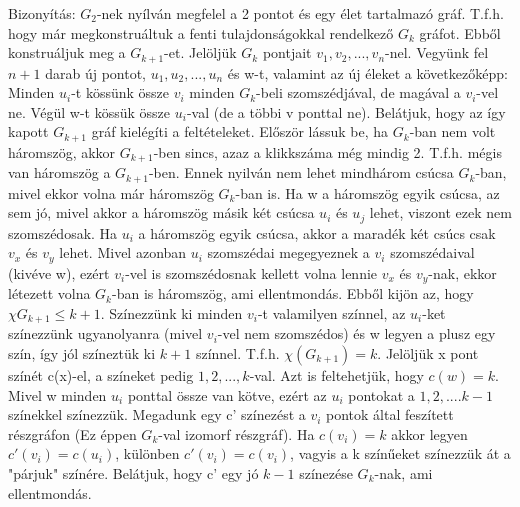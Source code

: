 \documentclass[]{article}
\begin{document}
\begin{leftbar}
Bizonyítás: $G_2$-nek nyílván megfelel a 2 pontot és egy élet tartalmazó gráf. T.f.h. hogy már megkonstruáltuk a fenti tulajdonságokkal rendelkező $G_k$ gráfot. Ebből konstruáljuk meg a $G_{k+1}$-et. Jelöljük $G_k$ pontjait $v_1, v_2,..., v_n$-nel. Vegyünk fel $n + 1$ darab új pontot, $u_1, u_2,..., u_n$ és w-t, valamint az új éleket a következőképp: Minden $u_i$-t kössünk össze $v_i$ minden $G_k$-beli szomszédjával, de magával a $v_i$-vel ne. Végül w-t kössük össze $u_i$-val (de a többi v ponttal ne). Belátjuk, hogy az így kapott $G_{k+1}$ gráf kielégíti a feltételeket. Először lássuk be, ha $G_k$-ban nem volt háromszög, akkor $G_{k+1}$-ben sincs, azaz a klikkszáma még mindig 2. T.f.h. mégis van háromszög a $G_{k+1}$-ben. Ennek nyilván nem lehet mindhárom csúcsa $G_k$-ban, mivel ekkor volna már háromszög $G_k$-ban is. Ha w a háromszög egyik csúcsa, az sem jó, mivel akkor a háromszög másik két csúcsa $u_i$ és $u_j$ lehet, viszont ezek nem szomszédosak. Ha $u_i$ a háromszög egyik csúcsa, akkor a maradék két csúcs csak $v_x$ és $v_y$ lehet. Mivel azonban $u_i$ szomszédai megegyeznek a $v_i$ szomszédaival (kivéve w), ezért $v_i$-vel is szomszédosnak kellett volna lennie $v_x$ és $v_y$-nak, ekkor létezett volna $G_k$-ban is háromszög, ami ellentmondás. Ebből kijön az, hogy $\chi{G_{k+1}} \leq k + 1$. Színezzünk ki minden $v_i$-t valamilyen színnel, az $u_i$-ket színezzünk ugyanolyanra (mivel $v_i$-vel nem szomszédos) és w legyen a plusz egy szín, így jól színeztük ki $k+1$ színnel. T.f.h. $\chi(G_{k+1}) = k$. Jelöljük x pont színét c(x)-el, a színeket pedig $1, 2,..., k$-val. Azt is feltehetjük, hogy $c(w) = k$. Mivel w minden $u_i$ ponttal össze van kötve, ezért az $u_i$ pontokat a $1, 2,....k - 1$ színekkel színezzük. Megadunk egy c' színezést a $v_i$ pontok által feszített részgráfon (Ez éppen $G_k$-val izomorf részgráf). Ha $c(v_i) = k$ akkor legyen $c'(v_i) = c(u_i)$, különben $c'(v_i) = c(v_i)$, vagyis a k színűeket színezzük át a "párjuk" színére. Belátjuk, hogy c' egy jó $k-1$ színezése $G_k$-nak, ami ellentmondás.
\end{leftbar}
\end{document}
